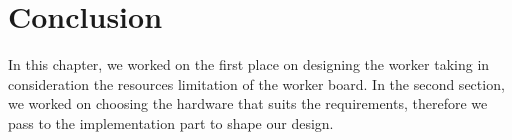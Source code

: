 \section{Conclusion}
    In this chapter, we worked on the first place on designing the worker taking in consideration the resources
    limitation of the worker board. In the second section, we worked on choosing the hardware that suits
    the requirements, therefore we pass to the implementation part to shape our design.